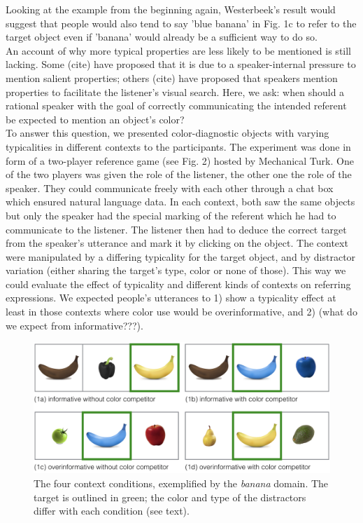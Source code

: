 \documentclass[10pt,letterpaper]{article}
\begin{document}
Looking at the example from the beginning again, Westerbeek's result would suggest that people would also tend to say 'blue banana'  in Fig. 1c to refer to the target object even if 'banana' would already be a sufficient way to do so.\\
An account of why more typical properties are less likely to be mentioned is still lacking. Some (cite) have proposed that it is due to a speaker-internal pressure to mention salient properties; others (cite) have proposed that speakers mention properties to facilitate the listener’s visual search. Here, we ask: when should a rational speaker with the goal of correctly communicating the intended referent be expected to mention an object’s color? \\
To answer this question, we presented color-diagnostic objects with varying typicalities in different contexts to the participants. The experiment was done in form of a two-player reference game (see Fig. 2) hosted by Mechanical Turk. One of the two players was given the role of the listener, the other one the role of the speaker. They could communicate freely with each other through a chat box which ensured natural language data. In each context, both saw the same objects but only the speaker had the special marking of the referent which he had to communicate to the listener. The listener then had to deduce the correct target from the speaker’s utterance and mark it by clicking on the object. 
The context were manipulated by a differing typicality for the target object, and by distractor variation (either sharing the target's type, color or none of those). This way we could evaluate the effect of typicality and different kinds of contexts on referring expressions.
We expected people’s utterances to 1) show a typicality effect at least in those contexts where color use would be overinformative, and 2) (what do we expect from informative???).

\begin{figure}[bt!]
	\centering
	\includegraphics[width=.5\textwidth]{graphs/context_overview}
	\caption{The four context conditions, exemplified by the \textit{banana} domain. The target is outlined in green; the color and type of the distractors differ with each condition (see text).
	}
	\label{fig:design}
\end{figure}
\end{document}
